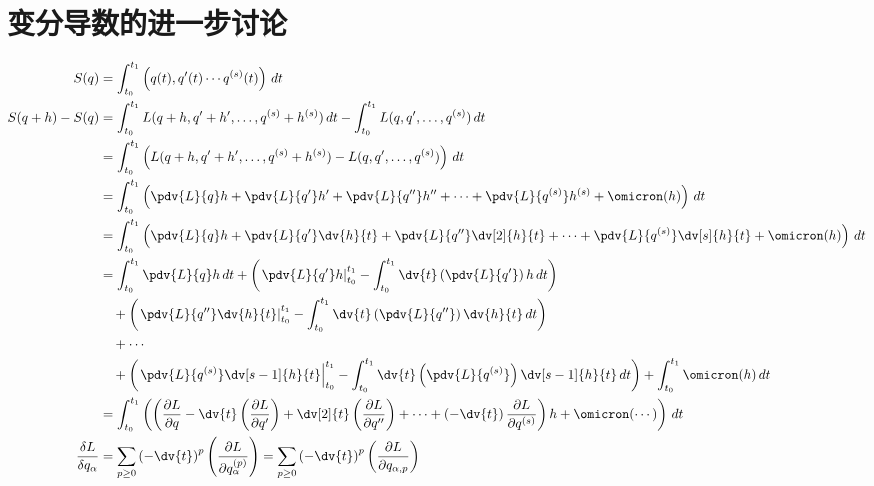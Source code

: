 \documentclass[12pt, a4paper, oneside, UTF8]{ctexbook}  %
\newcommand{\pa}{\partial}
\begin{document}
\section{变分导数的进一步讨论}
\begin{align*}
    S(q)&=\int_{t_0}^{t_1}\left(q(t),q'(t)\cdots q^{(s)}(t)\right)\,dt\\
    S(q + h) - S(q) &= \int_{t_0}^{t_1} L(q + h, q' + h', \dots, q^{(s)} + h^{(s)}) \, dt 
    - \int_{t_0}^{t_1} L(q, q', \dots, q^{(s)}) \, dt \\
    &= \int_{t_0}^{t_1} \left( L(q + h, q' + h', \dots, q^{(s)} + h^{(s)}) 
    - L(q, q', \dots, q^{(s)}) \right) \, dt \\
    &= \int_{t_0}^{t_1} \left( \pdv{L}{q} h + \pdv{L}{q'} h' + \pdv{L}{q''} h'' 
    + \cdots + \pdv{L}{q^{(s)}} h^{(s)} + \omicron(h) \right) \, dt \\
    &= \int_{t_0}^{t_1} \left( \pdv{L}{q} h + \pdv{L}{q'} \dv{h}{t} 
    + \pdv{L}{q''} \dv[2]{h}{t} + \cdots + \pdv{L}{q^{(s)}} \dv[s]{h}{t} 
    + \omicron(h) \right) \, dt \\
    &= \int_{t_0}^{t_1} \pdv{L}{q} h \, dt 
    + \left( \left. \pdv{L}{q'} h \right|_{t_0}^{t_1} 
    - \int_{t_0}^{t_1} \dv{t} \left( \pdv{L}{q'} \right) h \, dt \right) \\
&\quad + \left( \left. \pdv{L}{q''} \dv{h}{t} \right|_{t_0}^{t_1} 
- \int_{t_0}^{t_1} \dv{t} \left( \pdv{L}{q''} \right) \dv{h}{t} \, dt \right) \\
&\quad + \cdots \\
&\quad + \left( \left. \pdv{L}{q^{(s)}} \dv[s-1]{h}{t} \right|_{t_0}^{t_1} 
- \int_{t_0}^{t_1} \dv{t} \left( \pdv{L}{q^{(s)}} \right) \dv[s-1]{h}{t} \, dt \right) 
+ \int_{t_0}^{t_1} \omicron(h) \, dt \\
&=\int_{t_0}^{t_1}\left(\left(
    \frac{\pa L}{\pa q}-\dv{t}\left(\frac{\pa L}{\pa q'}\right)
    +\dv[2]{t}\left(\frac{\pa L}{\pa q''}\right)+\cdots+\left(-\dv{t}\right)\frac{\pa L}{\pa q^{(s)}}
\right)
h+\omicron(\cdots)\right)\,dt\\
\frac{\delta L}{\delta q_\alpha}&=
\sum_{p \geq 0}\left(-\dv{t}\right)^p
\left(\frac{\pa L}{\pa q_\alpha^{(p)}}\right)=
\sum_{p \geq 0}\left(-\dv{t}\right)^p
\left(\frac{\pa L}{\pa q_{\alpha,p}}\right)
\end{align*}
\end{document}
